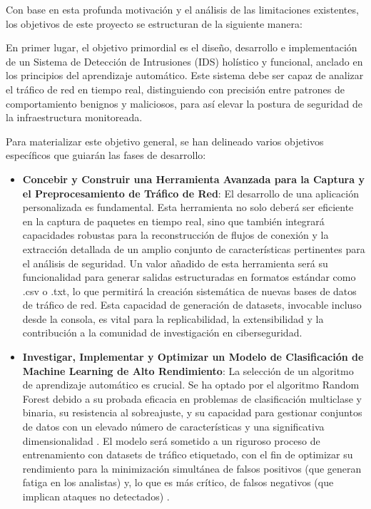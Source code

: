Con base en esta profunda motivación y el análisis de las limitaciones existentes, los objetivos de este proyecto se estructuran de la siguiente manera:

En primer lugar, el objetivo primordial es el diseño, desarrollo e implementación de un Sistema de Detección de Intrusiones (IDS) holístico y funcional, anclado en los principios del aprendizaje automático. Este sistema debe ser capaz de analizar el tráfico de red en tiempo real, distinguiendo con precisión entre patrones de comportamiento benignos y maliciosos, para así elevar la postura de seguridad de la infraestructura monitoreada.

Para materializar este objetivo general, se han delineado varios objetivos específicos que guiarán las fases de desarrollo:

\begin{itemize}

    \item\textbf{Concebir y Construir una Herramienta Avanzada para la Captura y el Preprocesamiento de Tráfico de Red}: El desarrollo de una aplicación personalizada es fundamental. Esta herramienta no solo deberá ser eficiente en la captura de paquetes en tiempo real, sino que también integrará capacidades robustas para la reconstrucción de flujos de conexión y la extracción detallada de un amplio conjunto de características pertinentes para el análisis de seguridad. Un valor añadido de esta herramienta será su funcionalidad para generar salidas estructuradas en formatos estándar como .csv o .txt, lo que permitirá la creación sistemática de nuevas bases de datos de tráfico de red. Esta capacidad de generación de datasets, invocable incluso desde la consola, es vital para la replicabilidad, la extensibilidad y la contribución a la comunidad de investigación en ciberseguridad.
    
    \item\textbf{Investigar, Implementar y Optimizar un Modelo de Clasificación de Machine Learning de Alto Rendimiento}: La selección de un algoritmo de aprendizaje automático es crucial. Se ha optado por el algoritmo Random Forest debido a su probada eficacia en problemas de clasificación multiclase y binaria, su resistencia al sobreajuste, y su capacidad para gestionar conjuntos de datos con un elevado número de características y una significativa dimensionalidad \cite{Breiman2001RandomForests}. El modelo será sometido a un riguroso proceso de entrenamiento con datasets de tráfico etiquetado, con el fin de optimizar su rendimiento para la minimización simultánea de falsos positivos (que generan fatiga en los analistas) y, lo que es más crítico, de falsos negativos (que implican ataques no detectados) \cite{PolaniaArias2021EvaluacionMLIDS}.
    

\end{itemize}
